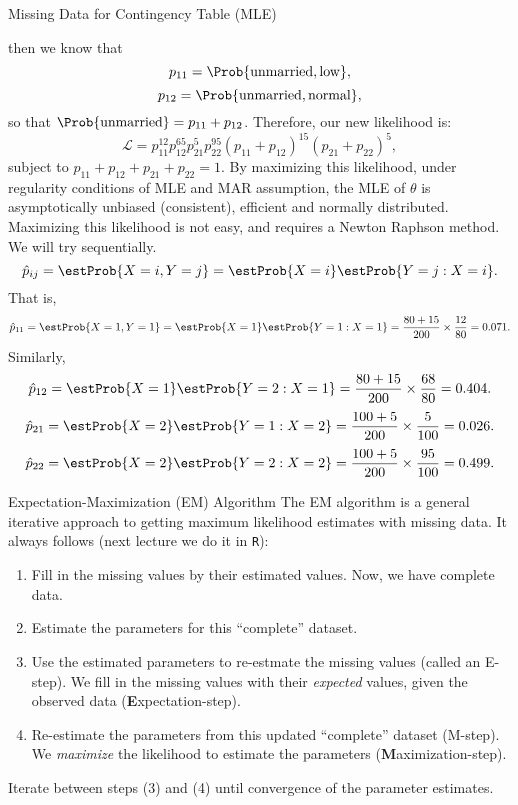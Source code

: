 \begin{Example}{Missing Data for Contingency Table (MLE)}
\begin{itemize}
              then we know that
              \[ p_{11}=\Prob{\text{unmarried},\text{low}}, \]
              \[ p_{12}=\Prob{\text{unmarried},\text{normal}}, \]
              so that $ \Prob{\text{unmarried}}=p_{11}+p_{12} $.
              Therefore, our new likelihood is:
              \[ \mathcal{L}=
                  p_{11}^{12}p_{12}^{65}p_{21}^{5}p_{22}^{95}
                  (p_{11}+p_{12})^{15}
                  (p_{21}+p_{22})^{5}, \]
              subject to $ p_{11}+p_{12}+p_{21}+p_{22}=1 $.
              By maximizing this likelihood,
              under regularity conditions of MLE and MAR assumption, the
              MLE of $ \theta $ is asymptotically unbiased (consistent),
              efficient and normally distributed. Maximizing
              this likelihood is not easy, and requires a Newton Raphson
              method. We will try sequentially.
              \[ \hat{p}_{ij}=
                  \estProb{X=i,Y=j}
                  =\estProb{X=i}
                  \estProb{Y=j\given X=i}. \]
              That is,
              \[ \hat{p}_{11}=\estProb{X=1,Y=1}
                  =\estProb{X=1}\estProb{Y=1\given X=1}
                  =\frac{80+15}{200}\times \frac{12}{80}=0.071. \]
              Similarly,
              \[ \hat{p}_{12}=\estProb{X=1}
                  \estProb{Y=2\given X=1}=
                  \frac{80+15}{200}\times \frac{68}{80}=0.404. \]
              \[ \hat{p}_{21}=\estProb{X=2}
                  \estProb{Y=1\given X=2}=\frac{100+5}{200}\times \frac{5}{100}=0.026. \]
              \[ \hat{p}_{22}=\estProb{X=2}
                  \estProb{Y=2\given X=2}=\frac{100+5}{200}\times \frac{95}{100}=0.499. \]
    \end{itemize}
\end{Example}
\begin{Regular}{Expectation-Maximization (EM) Algorithm}
    The EM algorithm is a general iterative approach
    to getting maximum likelihood estimates with missing data.
    It always follows (next lecture we do it in \texttt{R}):
    \begin{enumerate}[(1)]
        \item Fill in the missing values by their estimated values.
              Now, we have complete data.
        \item Estimate the parameters for this ``complete''
              dataset.
        \item Use the estimated parameters to re-estmate
              the missing values (called an E-step). We fill in
              the missing values with their \emph{expected} values, given
              the observed data (\textbf{E}xpectation-step).
        \item Re-estimate the parameters from this updated
              ``complete'' dataset (M-step). We \emph{maximize} the likelihood
              to estimate the parameters (\textbf{M}aximization-step).
    \end{enumerate}
    Iterate between steps (3) and (4) until convergence
    of the parameter estimates.
\end{Regular}
